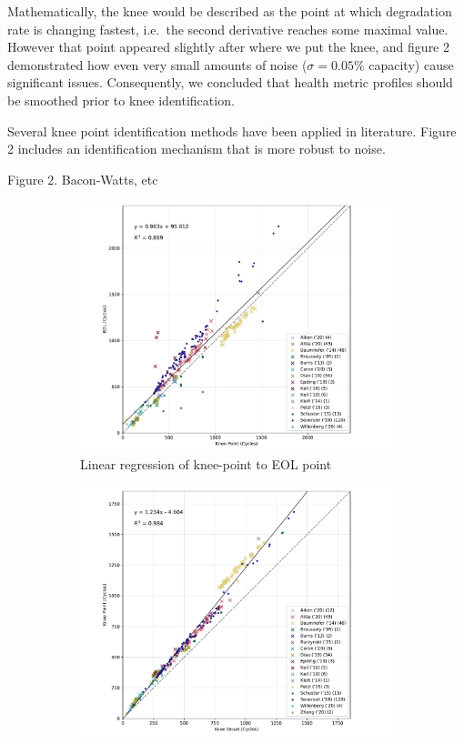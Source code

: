 \documentclass{article}
\begin{document}
Mathematically, the knee would be described as the point at which degradation rate is changing fastest, i.e.\ the second derivative reaches some maximal value. However that point appeared slightly after where we put the knee, and figure 2 demonstrated how even very small amounts of noise ($\sigma=0.05\%$ capacity) cause significant issues. Consequently, we concluded that health metric profiles should be smoothed prior to knee identification.

Several knee point identification methods have been applied in literature. Figure 2 includes an identification mechanism that is more robust to noise.

Figure 2. Bacon-Watts, etc




\begin{figure}[ht]
\centering
\begin{subfigure}{.5\textwidth}
  \centering
\includegraphics[width=1.1\linewidth]{figures/AcrossDatasetsknee-to-EOL}
  \caption{Linear regression of knee-point to EOL point}
  \label{fig:kneepoint2EOL}
\end{subfigure}%
\begin{subfigure}{.5\textwidth}
  \centering
  \includegraphics[width=1.1\linewidth]{figures/AcrossDatasetsonset-to-knee}

\end{subfigure}
\end{figure}
\end{document}

